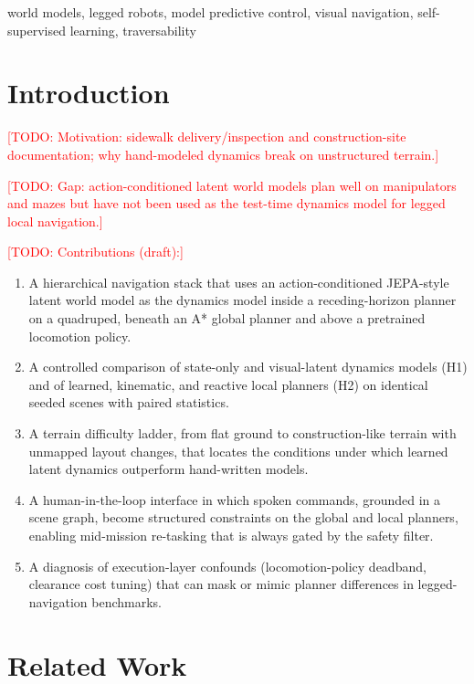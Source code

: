 \documentclass[conference]{IEEEtran}
\newcommand{\todo}[1]{\textcolor{red}{[TODO: #1]}}
\begin{document}
\begin{IEEEkeywords}
world models, legged robots, model predictive control, visual navigation,
self-supervised learning, traversability
\end{IEEEkeywords}

\section{Introduction}
\todo{Motivation: sidewalk delivery/inspection and construction-site
documentation; why hand-modeled dynamics break on unstructured terrain.}

\todo{Gap: action-conditioned latent world models
\cite{assran2025vjepa2,zhou2024dinowm,zholus2026robojepa} plan well on
manipulators and mazes but have not been used as the test-time dynamics
model for legged local navigation.}

\todo{Contributions (draft):}
\begin{enumerate}
  \item A hierarchical navigation stack that uses an action-conditioned
        JEPA-style latent world model as the dynamics model inside a
        receding-horizon planner on a quadruped, beneath an A* global
        planner and above a pretrained locomotion policy.
  \item A controlled comparison of state-only and visual-latent dynamics
        models (H1) and of learned, kinematic, and reactive local planners
        (H2) on identical seeded scenes with paired statistics.
  \item A terrain difficulty ladder, from flat ground to construction-like
        terrain with unmapped layout changes, that locates the conditions
        under which learned latent dynamics outperform hand-written models.
  \item A human-in-the-loop interface in which spoken commands, grounded
        in a scene graph, become structured constraints on the global and
        local planners, enabling mid-mission re-tasking that is always
        gated by the safety filter.
  \item A diagnosis of execution-layer confounds (locomotion-policy
        deadband, clearance cost tuning) that can mask or mimic planner
        differences in legged-navigation benchmarks.
\end{enumerate}

\section{Related Work}
\end{document}
